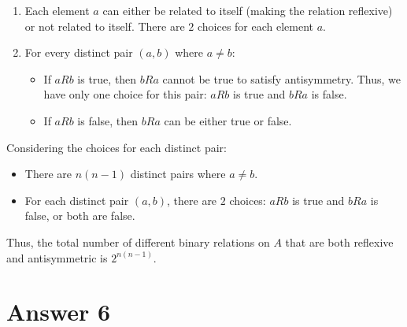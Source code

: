 \documentclass[12pt]{article}
\begin{document}
\begin{enumerate}
    \item Each element \( a \) can either be related to itself (making the relation reflexive) or not related to itself. There are \( 2 \) choices for each element \( a \).
    \item For every distinct pair \( (a, b) \) where \( a \neq b \):
    \begin{itemize}
        \item If \( aRb \) is true, then \( bRa \) cannot be true to satisfy antisymmetry. Thus, we have only one choice for this pair: \( aRb \) is true and \( bRa \) is false.
        \item If \( aRb \) is false, then \( bRa \) can be either true or false.
    \end{itemize}
\end{enumerate}

Considering the choices for each distinct pair:
\begin{itemize}
    \item There are \( n(n-1) \) distinct pairs where \( a \neq b \).
    \item For each distinct pair \( (a, b) \), there are \( 2 \) choices: \( aRb \) is true and \( bRa \) is false, or both are false.
\end{itemize}

Thus, the total number of different binary relations on \( A \) that are both reflexive and antisymmetric is \( 2^{n(n-1)} \).



\section*{Answer 6}
\end{document}
